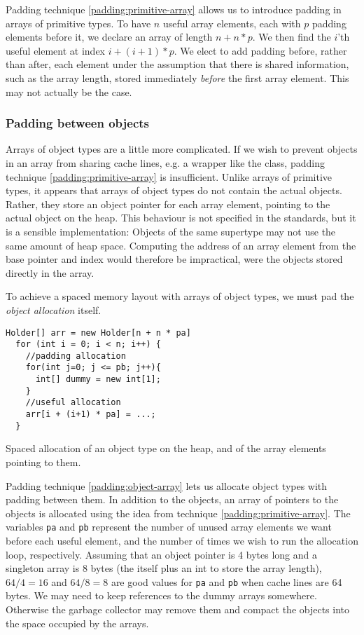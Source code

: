 Padding technique \ref{padding:primitive-array} allows us to introduce padding
in arrays of primitive types.
To have $n$ useful array elements, each with $p$ padding elements before it, we
declare an array of length $n + n * p$. We then find the $i$'th useful element
at index $i + (i+1) * p$. We elect to add padding before, rather than after,
each element under the assumption that there is shared information, such as
the array length, stored immediately \textit{before} the first array element.
This may not actually be the case.

\subsubsection{Padding between objects}
Arrays of object types are a little more complicated.
If we wish to prevent objects in an array from sharing cache lines, e.g.
a wrapper like the  class, padding technique
\ref{padding:primitive-array} is insufficient. Unlike arrays of primitive
types, it appears that arrays of object types do not contain the actual objects.
Rather, they store an object pointer for each array element, pointing to the
actual object on the heap. This behaviour is not specified in the standards, but
it is a sensible implementation: Objects of the same supertype may not use the
same amount of heap space. Computing the address of an array element from the
base pointer and index would therefore be impractical, were the objects
stored directly in the array.

To achieve a spaced memory layout with arrays of object types, we must pad the
\textit{object allocation} itself.

\begin{padding}[h]
\begin{Verbatim}[frame=single]
  Holder[] arr = new Holder[n + n * pa]
  for (int i = 0; i < n; i++) {
    //padding allocation
    for(int j=0; j <= pb; j++){
      int[] dummy = new int[1];
    }
    //useful allocation
    arr[i + (i+1) * pa] = ...;
  }
\end{Verbatim}
	\caption{Spaced allocation of an object type on the heap, and of the
	array elements pointing to them.}
	\label{padding:object-array}
\end{padding}

Padding technique \ref{padding:object-array} lets us allocate object
types with padding between them. In addition to the objects, an array of
pointers to the objects is allocated using the idea from technique
\ref{padding:primitive-array}. The variables \texttt{pa} and \texttt{pb}
represent the number of unused array elements we want before each useful
element, and the number of times we wish to run the allocation loop,
respectively. Assuming that an object pointer is 4 bytes long and a singleton
 array is 8 bytes (the  itself plus an int  to
store the array length), $64/4 = 16$ and $64/8 = 8$ are good values for
\texttt{pa} and \texttt{pb} when cache lines are 64 bytes. We may need to keep
references to the dummy arrays somewhere. Otherwise the garbage collector may
remove them and compact the objects into the space occupied by the arrays.


